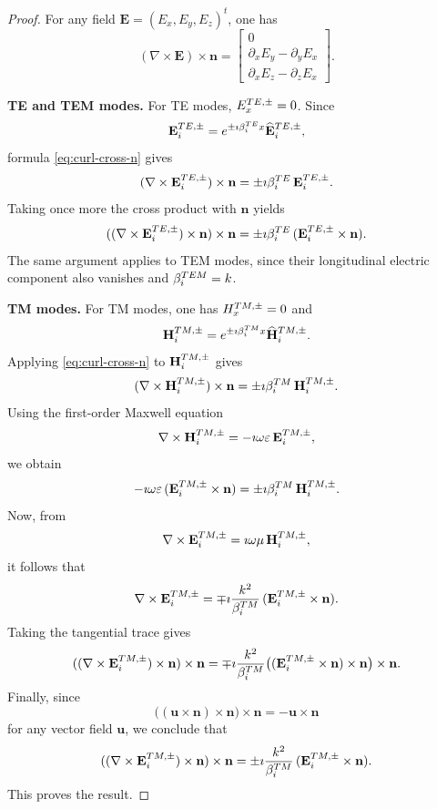\documentclass[10pt,a4paper]{amsart}
\begin{document}
\begin{proof}
For any field $\mathbf E=(E_x,E_y,E_z)^t$, one has
\begin{equation}\label{eq:curl-cross-n}
(\nabla\times \mathbf E)\times \mathbf n
=
\begin{bmatrix}
0\\
\partial_x E_y-\partial_y E_x\\
\partial_x E_z-\partial_z E_x
\end{bmatrix}.
\end{equation}

\smallskip
\noindent\textbf{TE and TEM modes.}
For TE modes, $E_x^{\rm TE,\pm}=0$. Since
\[
\mathbf E^{\rm TE,\pm}_i
=
e^{\pm \imath \beta_i^{\rm TE}x}\widehat{\mathbf E}_i^{\rm TE,\pm},
\]
formula \eqref{eq:curl-cross-n} gives
\[
(\nabla\times \mathbf E_i^{\rm TE,\pm})\times \mathbf n
=
\pm \imath \beta_i^{\rm TE}\,\mathbf E_i^{\rm TE,\pm}.
\]
Taking once more the cross product with $\mathbf n$ yields
\[
((\nabla\times \mathbf E_i^{\rm TE,\pm})\times \mathbf n)\times \mathbf n
=
\pm \imath \beta_i^{\rm TE}\,(\mathbf E_i^{\rm TE,\pm}\times \mathbf n).
\]
The same argument applies to TEM modes, since their longitudinal electric component also vanishes and $\beta_i^{\rm TEM}=k$.

\smallskip
\noindent\textbf{TM modes.}
For TM modes, one has $H_x^{\rm TM,\pm}=0$ and
\[
\mathbf H_i^{\rm TM,\pm}
=
e^{\pm \imath \beta_i^{\rm TM}x}\widehat{\mathbf H}_i^{\rm TM,\pm}.
\]
Applying \eqref{eq:curl-cross-n} to $\mathbf H_i^{\rm TM,\pm}$ gives
\[
(\nabla\times \mathbf H_i^{\rm TM,\pm})\times \mathbf n
=
\pm \imath \beta_i^{\rm TM}\,\mathbf H_i^{\rm TM,\pm}.
\]
Using the first-order Maxwell equation
\[
\nabla\times \mathbf H_i^{\rm TM,\pm}
=
-\imath \omega\varepsilon\,\mathbf E_i^{\rm TM,\pm},
\]
we obtain
\[
-\imath \omega\varepsilon\,(\mathbf E_i^{\rm TM,\pm}\times \mathbf n)
=
\pm \imath \beta_i^{\rm TM}\,\mathbf H_i^{\rm TM,\pm}.
\]
Now, from
\[
\nabla\times \mathbf E_i^{\rm TM,\pm}
=
\imath \omega\mu\,\mathbf H_i^{\rm TM,\pm},
\]
it follows that
\[
\nabla\times \mathbf E_i^{\rm TM,\pm}
=
\mp \imath \frac{k^2}{\beta_i^{\rm TM}}\,
(\mathbf E_i^{\rm TM,\pm}\times \mathbf n).
\]
Taking the tangential trace gives
\[
((\nabla\times \mathbf E_i^{\rm TM,\pm})\times \mathbf n)\times \mathbf n
=
\mp \imath \frac{k^2}{\beta_i^{\rm TM}}
\bigl((\mathbf E_i^{\rm TM,\pm}\times \mathbf n)\times \mathbf n\bigr)\times \mathbf n.
\]
Finally, since
\[
\bigl((\mathbf u\times \mathbf n)\times \mathbf n\bigr)\times \mathbf n
=
-\mathbf u\times \mathbf n
\]
for any vector field $\mathbf u$, we conclude that
\[
((\nabla\times \mathbf E_i^{\rm TM,\pm})\times \mathbf n)\times \mathbf n
=
\pm \imath \frac{k^2}{\beta_i^{\rm TM}}\,
(\mathbf E_i^{\rm TM,\pm}\times \mathbf n).
\]
This proves the result.
\end{proof}
\end{document}
